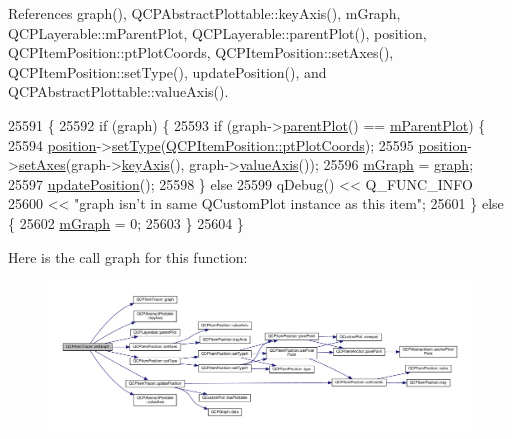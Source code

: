 References graph(), Q\+C\+P\+Abstract\+Plottable\+::key\+Axis(), m\+Graph, Q\+C\+P\+Layerable\+::m\+Parent\+Plot, Q\+C\+P\+Layerable\+::parent\+Plot(), position, Q\+C\+P\+Item\+Position\+::pt\+Plot\+Coords, Q\+C\+P\+Item\+Position\+::set\+Axes(), Q\+C\+P\+Item\+Position\+::set\+Type(), update\+Position(), and Q\+C\+P\+Abstract\+Plottable\+::value\+Axis().


\begin{DoxyCode}
25591                                             \{
25592   \textcolor{keywordflow}{if} (graph) \{
25593     \textcolor{keywordflow}{if} (graph->\hyperlink{class_q_c_p_layerable_ab7e0e94461566093d36ffc0f5312b109}{parentPlot}() == \hyperlink{class_q_c_p_layerable_aa2a528433e44db02b8aef23c1f9f90ed}{mParentPlot}) \{
25594       \hyperlink{class_q_c_p_item_tracer_a69917e2fdb2b3a929c196958feee7cbe}{position}->\hyperlink{class_q_c_p_item_position_aa476abf71ed8fa4c537457ebb1a754ad}{setType}(\hyperlink{class_q_c_p_item_position_aad9936c22bf43e3d358552f6e86dbdc8ad5ffb8dc99ad73263f7010c77342294c}{QCPItemPosition::ptPlotCoords});
25595       \hyperlink{class_q_c_p_item_tracer_a69917e2fdb2b3a929c196958feee7cbe}{position}->\hyperlink{class_q_c_p_item_position_a2185f45c75ac8cb9be89daeaaad50e37}{setAxes}(graph->\hyperlink{class_q_c_p_abstract_plottable_a72c7a09c22963f2c943f07112b311103}{keyAxis}(), graph->\hyperlink{class_q_c_p_abstract_plottable_a3106f9d34d330a6097a8ec5905e5b519}{valueAxis}());
25596       \hyperlink{class_q_c_p_item_tracer_a2d70cf616b579563aa15f796dfc143ac}{mGraph} = \hyperlink{class_q_c_p_item_tracer_a74c90da0e6730839b8d7cf6445a4ec1f}{graph};
25597       \hyperlink{class_q_c_p_item_tracer_a5b90296109e36384aedbc8908a670413}{updatePosition}();
25598     \} \textcolor{keywordflow}{else}
25599       qDebug() << Q\_FUNC\_INFO
25600                << \textcolor{stringliteral}{"graph isn't in same QCustomPlot instance as this item"};
25601   \} \textcolor{keywordflow}{else} \{
25602     \hyperlink{class_q_c_p_item_tracer_a2d70cf616b579563aa15f796dfc143ac}{mGraph} = 0;
25603   \}
25604 \}
\end{DoxyCode}


Here is the call graph for this function\+:\nopagebreak
\begin{figure}[H]
\begin{center}
\leavevmode
\includegraphics[width=350pt]{class_q_c_p_item_tracer_af5886f4ded8dd68cb4f3388f390790c0_cgraph}
\end{center}
\end{figure}



